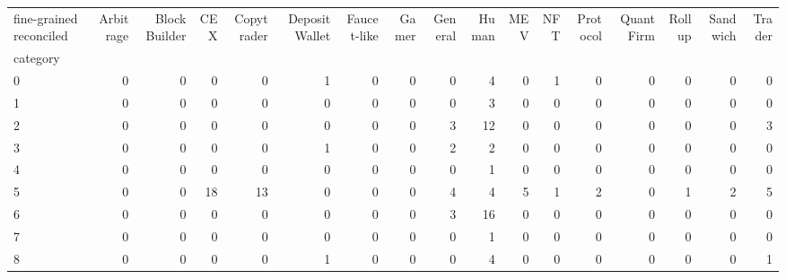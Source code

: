 \begin{tabular}{lrrrrrrrrrrrrrrrr}
\toprule
fine-grained reconciled &  Arbitrage &  Block Builder &  CEX &  Copytrader &  Deposit Wallet &  Faucet-like &  Gamer &  General &  Human &  MEV &  NFT &  Protocol &  Quant Firm &  Rollup &  Sandwich &  Trader \\
category &            &                &      &             &                 &              &        &          &        &      &      &           &             &         &           &         \\
\midrule
0        &          0 &              0 &    0 &           0 &               1 &            0 &      0 &        0 &      4 &    0 &    1 &         0 &           0 &       0 &         0 &       0 \\
1        &          0 &              0 &    0 &           0 &               0 &            0 &      0 &        0 &      3 &    0 &    0 &         0 &           0 &       0 &         0 &       0 \\
2        &          0 &              0 &    0 &           0 &               0 &            0 &      0 &        3 &     12 &    0 &    0 &         0 &           0 &       0 &         0 &       3 \\
3        &          0 &              0 &    0 &           0 &               1 &            0 &      0 &        2 &      2 &    0 &    0 &         0 &           0 &       0 &         0 &       0 \\
4        &          0 &              0 &    0 &           0 &               0 &            0 &      0 &        0 &      1 &    0 &    0 &         0 &           0 &       0 &         0 &       0 \\
5        &          0 &              0 &   18 &          13 &               0 &            0 &      0 &        4 &      4 &    5 &    1 &         2 &           0 &       1 &         2 &       5 \\
6        &          0 &              0 &    0 &           0 &               0 &            0 &      0 &        3 &     16 &    0 &    0 &         0 &           0 &       0 &         0 &       0 \\
7        &          0 &              0 &    0 &           0 &               0 &            0 &      0 &        0 &      1 &    0 &    0 &         0 &           0 &       0 &         0 &       0 \\
8        &          0 &              0 &    0 &           0 &               1 &            0 &      0 &        0 &      4 &    0 &    0 &         0 &           0 &       0 &         0 &       1 \\

\end{tabular}
